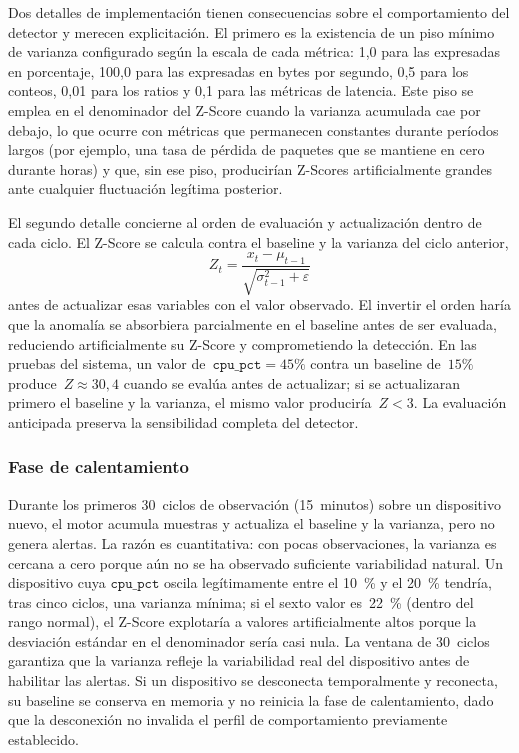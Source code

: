 Dos detalles de implementación tienen consecuencias sobre el 
comportamiento del detector y merecen explicitación. El primero es 
la existencia de un piso mínimo de varianza configurado según la 
escala de cada métrica: 1{,}0 para las expresadas en porcentaje, 
100{,}0 para las expresadas en bytes por segundo, 0{,}5 para los 
conteos, 0{,}01 para los ratios y 0{,}1 para las métricas de 
latencia. Este piso se emplea en el denominador del Z-Score cuando 
la varianza acumulada cae por debajo, lo que ocurre con métricas que 
permanecen constantes durante períodos largos (por ejemplo, una tasa 
de pérdida de paquetes que se mantiene en cero durante horas) y que, 
sin ese piso, producirían Z-Scores artificialmente grandes ante 
cualquier fluctuación legítima posterior.

El segundo detalle concierne al orden de evaluación y actualización 
dentro de cada ciclo. El Z-Score se calcula contra el baseline y la 
varianza del ciclo anterior, 
\begin{equation}
Z_t = \frac{x_t - \mu_{t-1}}{\sqrt{\sigma^2_{t-1} + \varepsilon}}
\label{eq:zscore-impl}
\end{equation}
antes de actualizar esas variables con el valor observado. El 
invertir el orden haría que la anomalía se absorbiera parcialmente 
en el baseline antes de ser evaluada, reduciendo artificialmente su 
Z-Score y comprometiendo la detección. En las pruebas del sistema, 
un valor de~\(\mathtt{cpu\_pct} = 45\%\) contra un baseline de~\(15\%\) 
produce~\(Z \approx 30{,}4\) cuando se evalúa antes de 
actualizar; si se actualizaran primero el baseline y la varianza, el 
mismo valor produciría~\(Z < 3\). La evaluación anticipada preserva 
la sensibilidad completa del detector.

\subsubsection{Fase de calentamiento}

Durante los primeros 30~ciclos de observación (15~minutos) sobre un 
dispositivo nuevo, el motor acumula muestras y actualiza el baseline 
y la varianza, pero no genera alertas. La razón es cuantitativa: con 
pocas observaciones, la varianza es cercana a cero porque aún no se 
ha observado suficiente variabilidad natural. Un dispositivo cuya 
\(\mathtt{cpu\_pct}\) oscila legítimamente entre el 10~\% y el 
20~\% tendría, tras cinco ciclos, una varianza mínima; si el sexto 
valor es~22~\% (dentro del rango normal), el Z-Score explotaría a 
valores artificialmente altos porque la desviación estándar en el 
denominador sería casi nula. La ventana de 30~ciclos garantiza que 
la varianza refleje la variabilidad real del dispositivo antes de 
habilitar las alertas. Si un dispositivo se desconecta 
temporalmente y reconecta, su baseline se conserva en memoria y no 
reinicia la fase de calentamiento, dado que la desconexión no 
invalida el perfil de comportamiento previamente establecido.

